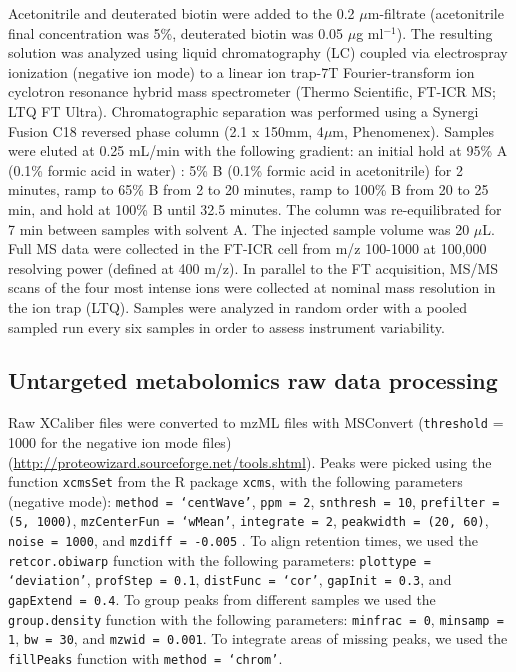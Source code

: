Acetonitrile and deuterated biotin were added to the 0.2 $\mu$m-filtrate (acetonitrile final concentration was 5\%, deuterated biotin was 0.05 $\mu$g ml$^{-1}$). The resulting solution was analyzed using liquid chromatography (LC) coupled via electrospray ionization (negative ion mode) to a linear ion trap-7T Fourier-transform ion cyclotron resonance hybrid mass spectrometer (Thermo Scientific, FT-ICR MS; LTQ FT Ultra). Chromatographic separation was performed using a Synergi Fusion C18 reversed phase column (2.1 x 150mm, 4$\mu$m, Phenomenex). Samples were eluted at 0.25 mL/min with the following gradient: an initial hold at 95\% A (0.1\% formic acid in water) : 5\% B (0.1\% formic acid in acetonitrile) for 2 minutes, ramp to 65\% B from 2 to 20 minutes, ramp to 100\% B from 20 to 25 min, and hold at 100\% B until 32.5 minutes. The column was re-equilibrated for 7 min between samples with solvent A.  The injected sample volume was 20 $\mu$L. Full MS data were collected in the FT-ICR cell from m/z 100-1000 at 100,000 resolving power (defined at 400 m/z). In parallel to the FT acquisition, MS/MS scans of the four most intense ions were collected at nominal mass resolution in the ion trap (LTQ). Samples were analyzed in random order with a pooled sampled run every six samples in order to assess instrument variability.

\subsection{Untargeted metabolomics raw data processing}

Raw XCaliber files were converted to mzML files with MSConvert (\texttt{threshold} = 1000 for the negative ion mode files) (\url{http://proteowizard.sourceforge.net/tools.shtml}). Peaks were picked using the function \texttt{xcmsSet} from the R package \texttt{xcms}, with the following parameters (negative mode): \texttt{method = `centWave'}, \texttt{ppm = 2}, \texttt{snthresh = 10}, \texttt{prefilter = (5, 1000)}, \texttt{mzCenterFun = `wMean'}, \texttt{integrate = 2}, \texttt{peakwidth = (20, 60)}, \texttt{noise = 1000}, and \texttt{mzdiff = -0.005} \cite{Smith2006}. To align retention times, we used the \texttt{retcor.obiwarp} function with the following parameters: \texttt{plottype = `deviation'}, \texttt{profStep = 0.1}, \texttt{distFunc = `cor'}, \texttt{gapInit = 0.3}, and \texttt{gapExtend = 0.4}. To group peaks from different samples we used the \texttt{group.density} function with the following parameters: \texttt{minfrac = 0}, \texttt{minsamp = 1}, \texttt{bw = 30}, and \texttt{mzwid = 0.001}. To integrate areas of missing peaks, we used the \texttt{fillPeaks} function with \texttt{method = `chrom'}.

